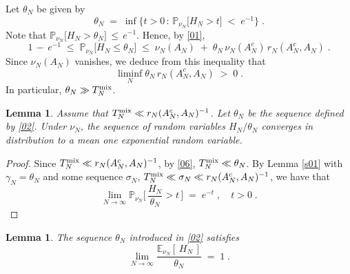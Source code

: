 \documentclass[reqno]{amsart}
\newtheorem{lemma}[theorem]{Lemma}
\begin{document}
Let $\theta_N$ be given by
\begin{equation}
\label{02}
\theta_N \;=\; \inf \Big\{t>0 \,:\,
{{\mathbb P}}_{\nu_N} \big[ H_N> t \big] 
\;<\; e^{-1} \Big\}\;.
\end{equation}
Note that ${{\mathbb P}}_{\nu_N} \big[ H_N> \theta_N \big] 
\,\le\, e^{-1}$. Hence, by \eqref{01},
\begin{equation*}
1\,-\, e^{-1} \;\le\; {{\mathbb P}}_{\nu_N} \big[ H_N \le
\theta_N \big] \;\le\; \nu_N (A_N) \;+\; 
\theta_N\, \nu_N (A_N^c)\, r_N(A_N^c, A_N)\;.
\end{equation*}
Since $\nu_N (A_N)$ vanishes, we deduce from this
inequality that
\begin{equation}
\label{06}
\liminf_N \theta_N\, r_N(A_N^c, A_N) \;>\; 0\;.
\end{equation}
In particular, $\theta_N \gg T^{\rm mix}_N$. 

\begin{lemma}
\label{s03}
Assume that $T^{\rm mix}_N \ll r_N(A_N^c, A_N)^{-1}$.
Let $\theta_N$ be the sequence defined by \eqref{02}. Under
$\nu_N$, the sequence of random variables
$H_N/\theta_N$ converges in distribution to a mean one exponential
random variable.
\end{lemma}

\begin{proof} 
Since $T^{\rm mix}_N \ll r_N(A_N^c, A_N)^{-1}$, by \eqref{06}, $T^{\rm
  mix}_N \ll \theta_N$.  By Lemma \ref{s01} with $\gamma_N = \theta_N$
and some sequence $\sigma_N$, $T^{\rm mix}_N \ll \sigma_N \ll
r_N(A_N^c, A_N)^{-1}$, we have that
\begin{equation*}
\lim_{N\to\infty} {{\mathbb P}}_{\nu_N} \Big[\,
\frac{H_N}{\theta_N} > t \,\Big] \;=\; e^{-t}\;, \quad t>0\;.
\end{equation*}
\end{proof}

\begin{lemma}
\label{s02}
The sequence $\theta_N$ introduced in \eqref{02} satisfies
\begin{equation*}
\lim_{N\to\infty} \frac{{{\mathbb E}}_{\nu_N} [\,
  H_N\,]}{\theta_N} \;=\; 1\;.
\end{equation*}
\end{lemma}
\end{document}
